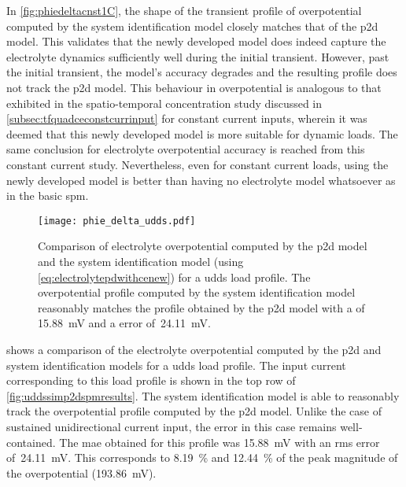In \cref{fig:phiedeltacnst1C},   the  shape   of   the   transient  profile   of
overpotential  computed  by  the  system identification  model  closely  matches
that  of the  \gls{p2d} model.  This validates  that the  newly developed  model
does  indeed  capture the  electrolyte  dynamics  sufficiently well  during  the
initial transient.  However, past  the initial  transient, the  model's accuracy
degrades and  the resulting  profile does  not track  the \gls{p2d}  model. This
behaviour in overpotential is analogous to that exhibited in the spatio-temporal
concentration   study   discussed  in \cref{subsec:tfquadceconstcurrinput}   for
constant current inputs,  wherein it was deemed that this  newly developed model
is  more  suitable  for  dynamic  loads. The  same  conclusion  for  electrolyte
overpotential   accuracy  is   reached   from  this   constant  current   study.
Nevertheless, even for  constant current loads, using the  newly developed model
is better than having no electrolyte model whatsoever as in the basic \gls{spm}.


\begin{figure}[!htbp]
    \centering
    \texttt{[image: phie\_delta\_udds.pdf]}
    \caption[%
    Electrolyte  overpotential  computed  by the    and  system
    identification models for a  load profile
    ]%
    {%
        Comparison    of    electrolyte    overpotential   computed    by    the
        \gls{p2d}     model    and     the    system     identification    model
        (using \cref{eq:electrolytepdwithcenew}) for a  \gls{udds} load profile.
        The overpotential  profile computed  by the system  identification model
        reasonably matches  the profile obtained  by the \gls{p2d} model  with a
         of \SI{15.88}{\milli\volt} and  a  error of~\SI{24.11}{\milli\volt}.
    }%
    \label{fig:phiedeltacnstudds}
\end{figure}

 shows a comparison of the electrolyte overpotential
computed by the \gls{p2d} and system identification models for a \gls{udds} load
profile. The  input current corresponding to  this load profile is  shown in the
top row  of \cref{fig:uddssimp2dspmresults}. The system  identification model is
able to  reasonably track  the overpotential profile  computed by  the \gls{p2d}
model. Unlike the  case of sustained unidirectional current input,  the error in
this case  remains well-contained. The  \gls{mae} obtained for this  profile was
\SI{15.88}{\milli\volt}  with  an  \gls{rms}  error  of~\SI{24.11}{\milli\volt}.
This  corresponds to  \SI{8.19}{\percent} and  \SI{12.44}{\percent} of  the peak
magnitude of the overpotential (\SI{193.86}{\milli\volt}).

